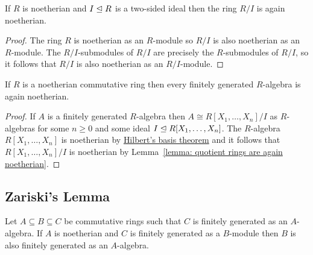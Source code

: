 \begin{lemma}
  \label{lemma: quotient rings are again noetherian}
  If $R$ is noetherian and $I \trianglelefteq R$ is a two-sided ideal then the ring $R/I$ is again noetherian.
\end{lemma}


\begin{proof}
  The ring $R$ is noetherian as an $R$-module so $R/I$ is also noetherian as an $R$-module.
  The $R/I$-submodules of $R/I$ are precisely the $R$-submodules of $R/I$, so it follows that $R/I$ is also noetherian as an $R/I$-module.
\end{proof}


\begin{corollary}
  \label{corollary: finite type preserves noetherian}
  If $R$ is a noetherian commutative ring then every finitely generated $R$-algebra is again noetherian.
\end{corollary}


\begin{proof}
  If $A$ is a finitely generated $R$-algebra then $A \cong R[X_1, \dotsc, X_n]/I$ as $R$-algebras for some $n \geq 0$ and some ideal $I \trianglelefteq R[X_1, \dotsc, X_n]$.
  The $R$-algebra $R[X_1, \dotsc, X_n]$ is noetherian by \hyperref[theorem: Hilberts basis theorem]{Hilbert's basis theorem} and it follows that $R[X_1, \dotsc, X_n]/I$ is noetherian by Lemma~\ref{lemma: quotient rings are again noetherian}.
\end{proof}





\subsection{Zariski’s Lemma}
\label{subsection: Zariskis lemma}


\begin{lemma}
  \label{lemma: technical ring lemma}
  Let $A \subseteq B \subseteq C$ be commutative rings such that $C$ is finitely generated as an $A$-algebra.
  If  $A$ is noetherian and $C$ is finitely generated as a $B$-module then $B$ is also finitely generated as an $A$-algebra.
\end{lemma}


